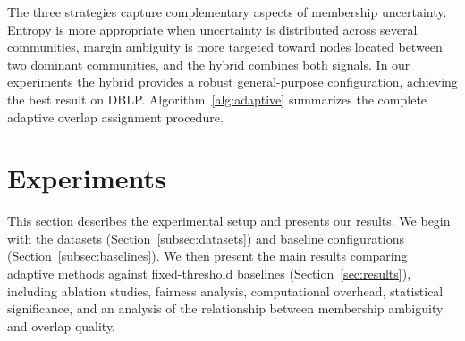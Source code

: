 \documentclass[pdflatex,sn-mathphys-num]{sn-jnl}%
\theoremstyle{thmstyleone}%
\theoremstyle{thmstyletwo}%
\theoremstyle{thmstylethree}%
\begin{document}
The three strategies capture complementary aspects of membership uncertainty.
Entropy is more appropriate when uncertainty is distributed across several communities, margin ambiguity is more targeted toward nodes located between two dominant communities, and the hybrid combines both signals.
In our experiments the hybrid provides a robust general-purpose configuration, achieving the best result on DBLP.
Algorithm~\ref{alg:adaptive} summarizes the complete adaptive overlap assignment procedure.

\begin{algorithm}[ht]
\caption{Adaptive Overlap Assignment}
\label{alg:adaptive}
\begin{algorithmic}[1]
  \Else
  \EndIf
\EndFor
{}
\end{algorithmic}
\end{algorithm}

\section{Experiments}
\label{sec:experiments}

This section describes the experimental setup and presents our results.
We begin with the datasets (Section~\ref{subsec:datasets}) and baseline configurations (Section~\ref{subsec:baselines}).
We then present the main results comparing adaptive methods against fixed-threshold baselines (Section~\ref{sec:results}), including ablation studies, fairness analysis, computational overhead, statistical significance, and an analysis of the relationship between membership ambiguity and overlap quality.
\end{document}
